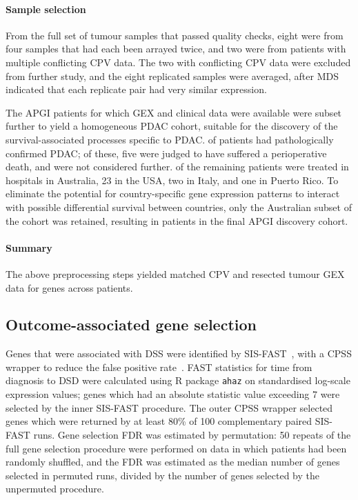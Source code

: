 \documentclass[dissertation.tex]{subfiles}
\begin{document}
\paragraph{Sample selection}  From the full set of  tumour samples that passed quality checks, eight were from four samples that had each been arrayed twice, and two were from patients with multiple conflicting \gls{CPV} data.  The two with conflicting \gls{CPV} data were excluded from further study, and the eight replicated samples were averaged, after \gls{MDS} indicated that each replicate pair had very similar expression.

The  \gls{APGI} patients for which \gls{GEX} and clinical data were available were subset further to yield a homogeneous \gls{PDAC} cohort, suitable for the discovery of the survival-associated processes specific to \gls{PDAC}.   of  patients had pathologically confirmed \gls{PDAC}; of these, five were judged to have suffered a perioperative death, and were not considered further.   of the  remaining patients were treated in hospitals in Australia, 23 in the USA, two in Italy, and one in Puerto Rico.  To eliminate the potential for country-specific gene expression patterns to interact with possible differential survival between countries, only the Australian subset of the cohort was retained, resulting in  patients in the final \gls{APGI} discovery cohort.

\paragraph{Summary}
The above preprocessing steps yielded matched \gls{CPV} and resected tumour \gls{GEX} data for  genes across  patients.

\subsection{Outcome-associated gene selection}
Genes that were associated with \gls{DSS} were identified by \gls{SIS}-\gls{FAST}~\cite{Gorst-Rasmussen2013}, with a \gls{CPSS} wrapper to reduce the false positive rate~\cite{Shah2013}.  \gls{FAST} statistics for time from diagnosis to \gls{DSD} were calculated using R package \texttt{ahaz} on standardised log-scale expression values; genes which had an absolute statistic value exceeding 7 were selected by the inner \gls{SIS}-\gls{FAST} procedure.  The outer \gls{CPSS} wrapper selected genes which were returned by at least 80\% of 100 complementary paired \gls{SIS}-\gls{FAST} runs.  Gene selection \gls{FDR} was estimated by permutation: 50 repeats of the full gene selection procedure were performed on data in which patients had been randomly shuffled, and the \gls{FDR} was estimated as the median number of genes selected in permuted runs, divided by the number of genes selected by the unpermuted procedure.
\end{document}
